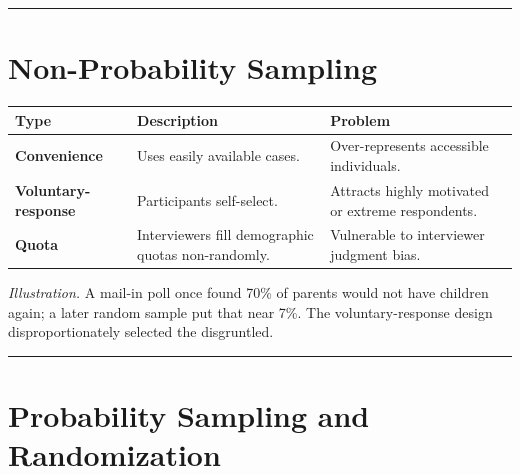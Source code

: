 \documentclass[
  letterpaper,
  DIV=11,
  numbers=noendperiod]{scrreprt}
\begin{document}
\begin{center}\rule{0.5\linewidth}{0.5pt}\end{center}

\section{Non-Probability Sampling}\label{non-probability-sampling}

\begin{longtable}[]{@{}
  >{\raggedright\arraybackslash}p{}
  >{\raggedright\arraybackslash}p{}
  >{\raggedright\arraybackslash}p{}@{}}
\toprule\noalign{}
\begin{minipage}[b]{\linewidth}\raggedright
\textbf{Type}
\end{minipage} & \begin{minipage}[b]{\linewidth}\raggedright
\textbf{Description}
\end{minipage} & \begin{minipage}[b]{\linewidth}\raggedright
\textbf{Problem}
\end{minipage} \\
\midrule\noalign{}
\endhead
\bottomrule\noalign{}
\endlastfoot
\textbf{Convenience} & Uses easily available cases. & Over-represents
accessible individuals. \\
\textbf{Voluntary-response} & Participants self-select. & Attracts
highly motivated or extreme respondents. \\
\textbf{Quota} & Interviewers fill demographic quotas non-randomly. &
Vulnerable to interviewer judgment bias. \\
\end{longtable}

\emph{Illustration.} A mail-in poll once found 70\% of parents would not
have children again; a later random sample put that near 7\%. The
voluntary-response design disproportionately selected the disgruntled.

\begin{center}\rule{0.5\linewidth}{0.5pt}\end{center}

\section{Probability Sampling and
Randomization}\label{probability-sampling-and-randomization}
\end{document}
